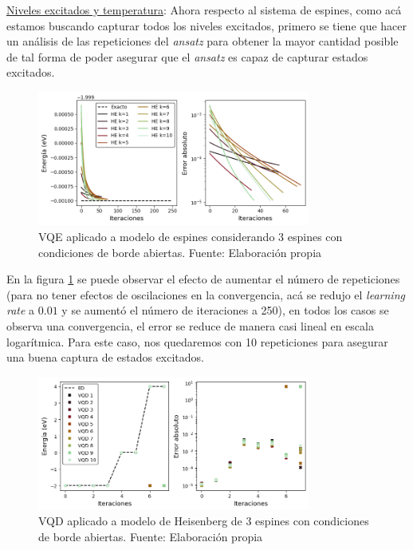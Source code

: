 \underline{Niveles excitados y temperatura}: 
Ahora respecto al sistema de espines, como acá estamos buscando capturar todos los niveles excitados, primero se tiene que hacer un análisis de las repeticiones del \textit{ansatz} para obtener la mayor cantidad posible de tal forma de poder asegurar que el \textit{ansatz} es capaz de capturar estados excitados. 

\begin{figure}[H]
\centering
\includegraphics[width=0.8\textwidth]{figures/S4/spins/temperatura1.png}
\caption{\label{fig:45} VQE aplicado a modelo de espines considerando 3 espines con condiciones de borde abiertas. Fuente: Elaboración propia}
\end{figure}

En la figura \ref{fig:45} se puede observar el efecto de aumentar el número de repeticiones (para no tener efectos de oscilaciones en la convergencia, acá se redujo el \textit{learning rate} a $0.01$ y se aumentó el número de iteraciones a 250), en todos los casos se observa una convergencia, el error se reduce de manera casi lineal en escala logarítmica. Para este caso, nos quedaremos con 10 repeticiones para asegurar una buena captura de estados excitados.

\begin{figure}[H]
\centering
\includegraphics[width=0.8\textwidth]{figures/S4/spins/temperatura2.png}
\caption{\label{fig:46} VQD aplicado a modelo de Heisenberg de 3 espines con condiciones de borde abiertas. Fuente: Elaboración propia}
\end{figure}

